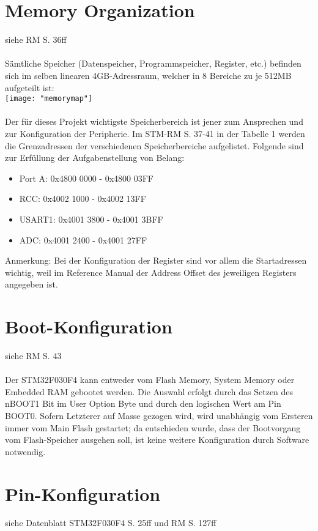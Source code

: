 \documentclass[11pt]{report}
\begin{document}
	\section{Memory Organization}
		siehe RM S. 36ff\\
		\\Sämtliche Speicher (Datenspeicher, Programmspeicher, Register, etc.) befinden sich im selben linearen 4GB-Adressraum, welcher in 8 Bereiche zu je 512MB aufgeteilt ist:\\
		\texttt{[image: "memorymap"]}\\
		\\Der für dieses Projekt wichtigste Speicherbereich ist jener zum Ansprechen und zur Konfiguration der Peripherie. Im STM-RM S. 37-41 in der Tabelle 1 werden die Grenzadressen der verschiedenen Speicherbereiche aufgelistet. Folgende sind zur Erfüllung der Aufgabenstellung von Belang:
		\begin{itemize}
			\item Port A: 0x4800 0000 - 0x4800 03FF
			\item RCC: 0x4002 1000 - 0x4002 13FF
			\item USART1: 0x4001 3800 - 0x4001 3BFF
			\item ADC: 0x4001 2400 - 0x4001 27FF
		\end{itemize}
		Anmerkung: Bei der Konfiguration der Register sind vor allem die Startadressen wichtig, weil im Reference Manual der Address Offset des jeweiligen Registers angegeben ist.
	\section{Boot-Konfiguration}
		siehe RM S. 43\\
		\\Der STM32F030F4 kann entweder vom Flash Memory, System Memory oder Embedded RAM gebootet werden. Die Auswahl erfolgt durch das Setzen des nBOOT1 Bit im User Option Byte und durch den logischen Wert am Pin BOOT0. Sofern Letzterer auf Masse gezogen wird, wird unabhängig vom Ersteren immer vom Main Flash gestartet; da entschieden wurde, dass der Bootvorgang vom Flash-Speicher ausgehen soll, ist keine weitere Konfiguration durch Software notwendig.
	\section{Pin-Konfiguration}
		siehe Datenblatt STM32F030F4 S. 25ff und RM S. 127ff
\end{document}
